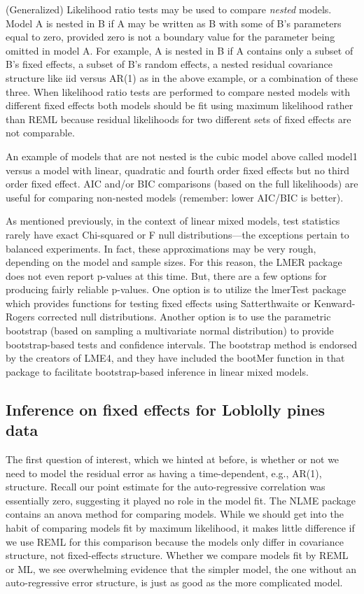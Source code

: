 \documentclass[
]{book}
\begin{document}
(Generalized) Likelihood ratio tests may be used to compare \emph{nested} models. Model A is nested in B if A may be written as B with some of B's parameters equal to zero, provided zero is not a boundary value for the parameter being omitted in model A. For example, A is nested in B if A contains only a subset of B's fixed effects, a subset of B's random effects, a nested residual covariance structure like iid versus AR(1) as in the above example, or a combination of these three. When likelihood ratio tests are performed to compare nested models with different fixed effects both models should be fit using maximum likelihood rather than REML because residual likelihoods for two different sets of fixed effects are not comparable.

An example of models that are not nested is the cubic model above called model1 versus a model with linear, quadratic and fourth order fixed effects but no third order fixed effect. AIC and/or BIC comparisons (based on the full likelihoods) are useful for comparing non-nested models (remember: lower AIC/BIC is better).

As mentioned previously, in the context of linear mixed models, test statistics rarely have exact Chi-squared or F null distributions---the exceptions pertain to balanced experiments. In fact, these approximations may be very rough, depending on the model and sample sizes. For this reason, the LMER package does not even report p-values at this time. But, there are a few options for producing fairly reliable p-values. One option is to utilize the lmerTest package which provides functions for testing fixed effects using Satterthwaite or Kenward-Rogers corrected null distributions. Another option is to use the parametric bootstrap (based on sampling a multivariate normal distribution) to provide bootstrap-based tests and confidence intervals. The bootstrap method is endorsed by the creators of LME4, and they have included the bootMer function in that package to facilitate bootstrap-based inference in linear mixed models.

\hypertarget{inference-on-fixed-effects-for-loblolly-pines-data}{%
\subsection{Inference on fixed effects for Loblolly pines data}\label{inference-on-fixed-effects-for-loblolly-pines-data}}

The first question of interest, which we hinted at before, is whether or not we need to model the residual error as having a time-dependent, e.g., AR(1), structure. Recall our point estimate for the auto-regressive correlation was essentially zero, suggesting it played no role in the model fit. The NLME package contains an anova method for comparing models. While we should get into the habit of comparing models fit by maximum likelihood, it makes little difference if we use REML for this comparison because the models only differ in covariance structure, not fixed-effects structure. Whether we compare models fit by REML or ML, we see overwhelming evidence that the simpler model, the one without an auto-regressive error structure, is just as good as the more complicated model.
\end{document}
